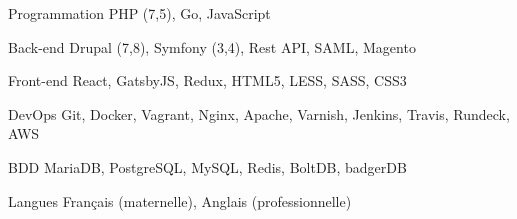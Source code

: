 

\begin{cvskills}

  \cvskill
    {Programmation} %
    {PHP (7,5), Go, JavaScript} %

  \cvskill
    {Back-end} %
    {Drupal (7,8), Symfony (3,4), Rest API, SAML, Magento} %

  \cvskill
    {Front-end} %
    {React, GatsbyJS, Redux, HTML5, LESS, SASS, CSS3} %

  \cvskill
    {DevOps} %
    {Git, Docker, Vagrant, Nginx, Apache, Varnish, Jenkins, Travis, Rundeck, AWS} %

  \cvskill
    {BDD} %
    {MariaDB, PostgreSQL, MySQL, Redis, BoltDB, badgerDB} %

  \cvskill
    {Langues} %
    {Français (maternelle), Anglais (professionnelle)} %

\end{cvskills}
